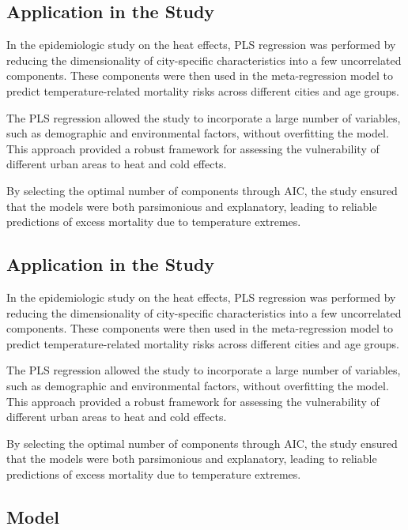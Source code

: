 \documentclass[
]{krantz}
\begin{document}
\subsection{Application in the Study}\label{application-in-the-study}

In the epidemiologic study on the heat effects, PLS regression was performed by reducing the dimensionality of city-specific characteristics into a few uncorrelated components. These components were then used in the meta-regression model to predict temperature-related mortality risks across different cities and age groups.

The PLS regression allowed the study to incorporate a large number of variables, such as demographic and environmental factors, without overfitting the model. This approach provided a robust framework for assessing the vulnerability of different urban areas to heat and cold effects.

By selecting the optimal number of components through AIC, the study ensured that the models were both parsimonious and explanatory, leading to reliable predictions of excess mortality due to temperature extremes.

\subsection{Application in the Study}\label{application-in-the-study-1}

In the epidemiologic study on the heat effects, PLS regression was performed by reducing the dimensionality of city-specific characteristics into a few uncorrelated components. These components were then used in the meta-regression model to predict temperature-related mortality risks across different cities and age groups.

The PLS regression allowed the study to incorporate a large number of variables, such as demographic and environmental factors, without overfitting the model. This approach provided a robust framework for assessing the vulnerability of different urban areas to heat and cold effects.

By selecting the optimal number of components through AIC, the study ensured that the models were both parsimonious and explanatory, leading to reliable predictions of excess mortality due to temperature extremes.

\subsection{Model}\label{model-1}
\end{document}
